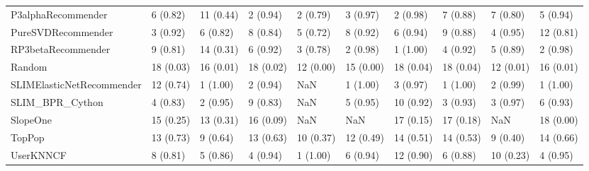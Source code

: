 \begin{tabular}{llllllllll}
                 P3alphaRecommender &                 6 (0.82) &   11 (0.44) &      2 (0.94) &     2 (0.79) &             3 (0.97) &            2 (0.98) &          7 (0.88) &           7 (0.80) &          5 (0.94) \\
                 PureSVDRecommender &                 3 (0.92) &    6 (0.82) &      8 (0.84) &     5 (0.72) &             8 (0.92) &            6 (0.94) &          9 (0.88) &           4 (0.95) &         12 (0.81) \\
                 RP3betaRecommender &                 9 (0.81) &   14 (0.31) &      6 (0.92) &     3 (0.78) &             2 (0.98) &            1 (1.00) &          4 (0.92) &           5 (0.89) &          2 (0.98) \\
                             Random &                18 (0.03) &   16 (0.01) &     18 (0.02) &    12 (0.00) &            15 (0.00) &           18 (0.04) &         18 (0.04) &          12 (0.01) &         16 (0.01) \\
          SLIMElasticNetRecommender &                12 (0.74) &    1 (1.00) &      2 (0.94) &          NaN &             1 (1.00) &            3 (0.97) &          1 (1.00) &           2 (0.99) &          1 (1.00) \\
                    SLIM\_BPR\_Cython &                 4 (0.83) &    2 (0.95) &      9 (0.83) &          NaN &             5 (0.95) &           10 (0.92) &          3 (0.93) &           3 (0.97) &          6 (0.93) \\
                           SlopeOne &                15 (0.25) &   13 (0.31) &     16 (0.09) &          NaN &                  NaN &           17 (0.15) &         17 (0.18) &                NaN &         18 (0.00) \\
                             TopPop &                13 (0.73) &    9 (0.64) &     13 (0.63) &    10 (0.37) &            12 (0.49) &           14 (0.51) &         14 (0.53) &           9 (0.40) &         14 (0.66) \\
                          UserKNNCF &                 8 (0.81) &    5 (0.86) &      4 (0.94) &     1 (1.00) &             6 (0.94) &           12 (0.90) &          6 (0.88) &          10 (0.23) &          4 (0.95) \\
\bottomrule
\end{tabular}
